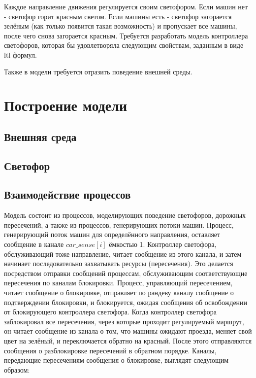 \documentclass[12pt]{article}
\begin{document}
\newpage

Каждое направление движения регулируется своим светофором. Если машин нет - светофор горит красным
светом. Если машины есть - светофор загорается зелёным (как только появится такая возможность)
и пропускает все машины, после чего снова загорается красным.
Требуется разработать модель контроллера светофоров, которая бы удовлетворяла следующим свойствам,
заданным в виде ltl формул.

Также в модели требуется отразить поведение внешней среды.




\section{Построение модели}

\subsection{Внешняя среда}

\subsection{Светофор}

\subsection{Взаимодействие процессов}

Модель состоит из процессов, моделирующих поведение светофоров, дорожных пересечений, а также
из процессов, генерирующих потоки машин. Процесс, генерирующий поток машин для определённого 
направления, оставляет сообщение в канале $car\_sense[i]$ ёмкостью 1. Контроллер светофора, 
обслуживающий тоже направление, читает сообщение из этого канала, и затем начинает последовательно 
захватывать ресурсы (пересечения). Это делается посредством отправки сообщений процессам, 
обслуживающим соответствующие пересечения по каналам блокировки. Процесс, управляющий пересечением,
читает сообщение о блокировке, отправляет по рандеву каналу сообщение о подтверждении блокировки, и
блокируется, ожидая сообщения об освобождении от блокирующего контроллера светофора. Когда
контроллер светофора заблокировал все пересечения, через которые проходит регулируемый маршрут, 
он читает сообщение из канала о том, что машины ожидают проезда, меняет свой цвет на зелёный, и
переключается обратно на красный. После этого отправляются сообщения о разблокировке пересечений в
обратном порядке. 
    Каналы, передающие пересечениям сообщения о блокировке, выглядят следующим образом:
\end{document}
